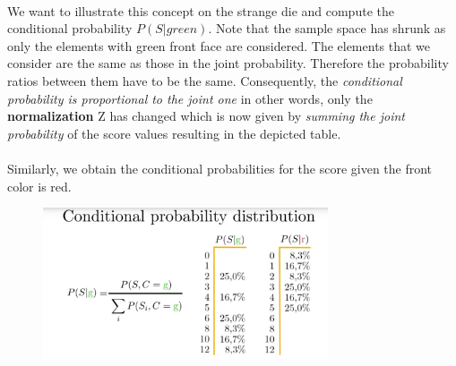 \documentclass[12pt, a4paper]{scrartcl}
\begin{document}
\\

We want to illustrate this concept on the strange die and compute the conditional probability $P(S|green)$.
Note that the sample space has shrunk as only the elements with green front face are considered.
The elements that we consider are the same as those in the joint probability. Therefore the probability ratios between them have to be the same.
Consequently, the \textit{conditional probability is proportional to the joint one} in other words, only the \textbf{normalization} Z has changed which is now given by \textit{summing the joint probability} of the score values resulting in the depicted table.\\

\\
Similarly, we obtain the conditional probabilities for the score given the front color is red.\\ %
\begin{figure}[H]
	\centering
	\includegraphics[width=0.75\textwidth]{3_6.png}
\end{figure}
\end{document}
